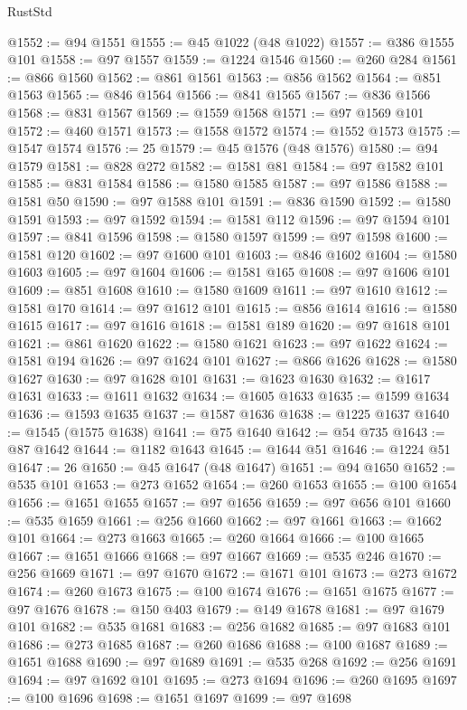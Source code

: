 \begin{lexlean}{RustStd}
\begin{coremodule}
@1552 := @94 @1551
@1555 := @45 @1022 (@48 @1022)
@1557 := @386 @1555 @101
@1558 := @97 @1557
@1559 := @1224 @1546
@1560 := @260 @284
@1561 := @866 @1560
@1562 := @861 @1561
@1563 := @856 @1562
@1564 := @851 @1563
@1565 := @846 @1564
@1566 := @841 @1565
@1567 := @836 @1566
@1568 := @831 @1567
@1569 := @1559 @1568
@1571 := @97 @1569 @101
@1572 := @460 @1571
@1573 := @1558 @1572
@1574 := @1552 @1573
@1575 := @1547 @1574
@1576 := 25
@1579 := @45 @1576 (@48 @1576)
@1580 := @94 @1579
@1581 := @828 @272
@1582 := @1581 @81
@1584 := @97 @1582 @101
@1585 := @831 @1584
@1586 := @1580 @1585
@1587 := @97 @1586
@1588 := @1581 @50
@1590 := @97 @1588 @101
@1591 := @836 @1590
@1592 := @1580 @1591
@1593 := @97 @1592
@1594 := @1581 @112
@1596 := @97 @1594 @101
@1597 := @841 @1596
@1598 := @1580 @1597
@1599 := @97 @1598
@1600 := @1581 @120
@1602 := @97 @1600 @101
@1603 := @846 @1602
@1604 := @1580 @1603
@1605 := @97 @1604
@1606 := @1581 @165
@1608 := @97 @1606 @101
@1609 := @851 @1608
@1610 := @1580 @1609
@1611 := @97 @1610
@1612 := @1581 @170
@1614 := @97 @1612 @101
@1615 := @856 @1614
@1616 := @1580 @1615
@1617 := @97 @1616
@1618 := @1581 @189
@1620 := @97 @1618 @101
@1621 := @861 @1620
@1622 := @1580 @1621
@1623 := @97 @1622
@1624 := @1581 @194
@1626 := @97 @1624 @101
@1627 := @866 @1626
@1628 := @1580 @1627
@1630 := @97 @1628 @101
@1631 := @1623 @1630
@1632 := @1617 @1631
@1633 := @1611 @1632
@1634 := @1605 @1633
@1635 := @1599 @1634
@1636 := @1593 @1635
@1637 := @1587 @1636
@1638 := @1225 @1637
@1640 := @1545 (@1575 @1638)
@1641 := @75 @1640
@1642 := @54 @735
@1643 := @87 @1642
@1644 := @1182 @1643
@1645 := @1644 @51
@1646 := @1224 @51
@1647 := 26
@1650 := @45 @1647 (@48 @1647)
@1651 := @94 @1650
@1652 := @535 @101
@1653 := @273 @1652
@1654 := @260 @1653
@1655 := @100 @1654
@1656 := @1651 @1655
@1657 := @97 @1656
@1659 := @97 @656 @101
@1660 := @535 @1659
@1661 := @256 @1660
@1662 := @97 @1661
@1663 := @1662 @101
@1664 := @273 @1663
@1665 := @260 @1664
@1666 := @100 @1665
@1667 := @1651 @1666
@1668 := @97 @1667
@1669 := @535 @246
@1670 := @256 @1669
@1671 := @97 @1670
@1672 := @1671 @101
@1673 := @273 @1672
@1674 := @260 @1673
@1675 := @100 @1674
@1676 := @1651 @1675
@1677 := @97 @1676
@1678 := @150 @403
@1679 := @149 @1678
@1681 := @97 @1679 @101
@1682 := @535 @1681
@1683 := @256 @1682
@1685 := @97 @1683 @101
@1686 := @273 @1685
@1687 := @260 @1686
@1688 := @100 @1687
@1689 := @1651 @1688
@1690 := @97 @1689
@1691 := @535 @268
@1692 := @256 @1691
@1694 := @97 @1692 @101
@1695 := @273 @1694
@1696 := @260 @1695
@1697 := @100 @1696
@1698 := @1651 @1697
@1699 := @97 @1698

\end{coremodule}
\end{lexlean}

